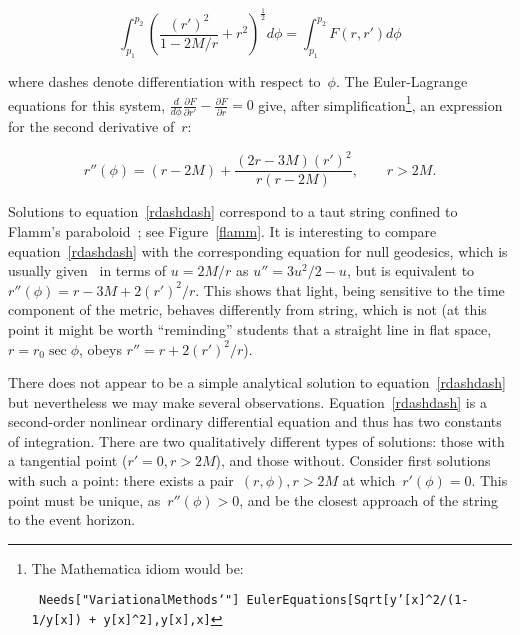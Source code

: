 \documentclass[review]{elsarticle}
\begin{document}

\begin{equation}
  \int_{p_1}^{p_2}\left(\frac{\left(r'\right)^2}{1-2M/r} + r^2\right)^\frac{1}{2}d\phi=
  \int_{p_1}^{p_2}F\left(r,r'\right)d\phi
\end{equation}

\noindent where dashes denote differentiation with respect to~$\phi$.  The
Euler-Lagrange equations for this system,
$\frac{d}{d\phi}\frac{\partial F}{\partial r'}-\frac{\partial
  F}{\partial r}=0$ give, after simplification\footnote{The Mathematica
  idiom would be:

\noindent
{\tt
Needs["VariationalMethods`"]\\
EulerEquations[Sqrt[y'[x]\^{}2/(1-1/y[x]) + y[x]\^{}2],y[x],x]}}, an expression for the second derivative of~$r$:

\begin{equation}\label{rdashdash}
  r''\left(\phi\right) =
  (r-2M) + \frac{(2r-3M)\left(r'\right)^2}{r\left(r-2M\right)},\qquad r>2M.
\end{equation}

\noindent 
Solutions to equation~\ref{rdashdash} correspond to a taut string
confined to Flamm's paraboloid~\cite{flamm1916}; see
Figure~\ref{flamm}.  It is interesting to compare
equation~\ref{rdashdash} with the corresponding equation for null
geodesics, which is usually given~\cite{wald} in terms of $u=2M/r$ as
$u''=3u^2/2-u$, but is equivalent
to~$r''\left(\phi\right)=r-3M+2\left(r'\right)^2/r$.  This shows that
light, being sensitive to the time component of the metric, behaves
differently from string, which is not (at this point it might be worth
``reminding'' students that a straight line in flat space,
$r=r_0\sec\phi$, obeys $r''=r+2\left(r'\right)^2/r$).

There does not appear to be a simple analytical solution to
equation~\ref{rdashdash} but nevertheless we may make several
observations.  Equation~\ref{rdashdash} is a second-order nonlinear
ordinary differential equation and thus has two constants of
integration.  There are two qualitatively different types of
solutions: those with a tangential point ($r'=0,r>2M$), and those
without.  Consider first solutions with such a point: there exists a
pair~$\left(r,\phi\right), r>2M$ at which~$r'(\phi)=0$.  This point
must be unique, as~$r''(\phi)>0$, and be the closest approach of the
string to the event horizon.
\end{document}
